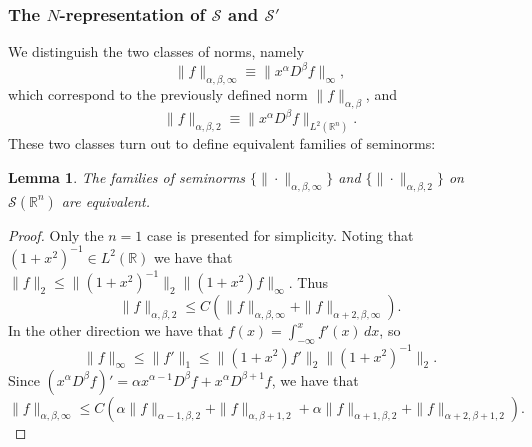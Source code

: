 \documentclass[prl,twocolumn,lengthcheck,superscriptaddress]{revtex4-1}
\newtheorem{lemma}{Lemma}
\theoremstyle{definition}
\theoremstyle{remark}
\begin{document}
\subsubsection{The $N$-representation of $\mathscr{S}$ and $\mathscr{S}'$}
We distinguish the two classes of norms, namely 
\begin{equation}
	\|f\|_{\alpha,\beta,\infty} \equiv \|x^\alpha D^\beta f\|_{\infty},
\end{equation}
which correspond to the previously defined norm $\|f\|_{\alpha,\beta}$, and 
\begin{equation}
	\|f\|_{\alpha,\beta,2} \equiv \|x^\alpha D^\beta f\|_{L^2(\mathbb{R}^n)}.
\end{equation}
These two classes turn out to define equivalent families of seminorms:
\begin{lemma}
	The families of seminorms $\{\|\cdot\|_{\alpha,\beta,\infty}\}$ and $\{\|\cdot\|_{\alpha,\beta,2}\}$ on $\mathscr{S}(\mathbb{R}^n)$ are equivalent.
\end{lemma}
\begin{proof}
	Only the $n=1$ case is presented for simplicity. Noting that $(1+x^2)^{-1} \in L^2(\mathbb{R})$ we have that $\|f\|_2 \le \|(1+x^2)^{-1}\|_2\|(1+x^2)f\|_{\infty}$. Thus
	\begin{equation}
		\|f\|_{\alpha,\beta,2} \le C(\|f\|_{\alpha,\beta,\infty} + \|f\|_{\alpha+2,\beta,\infty}).
	\end{equation}
	In the other direction we have that $f(x) = \int_{-\infty}^x f'(x)\, dx$, so
	\begin{equation}
		\|f\|_\infty \le \|f'\|_1 \le \|(1+x^2)f'\|_2\|(1+x^2)^{-1}\|_2.
	\end{equation}
	Since $(x^\alpha D^\beta f)' = \alpha x^{\alpha-1} D^\beta f + x^{\alpha} D^{\beta+1} f$, we have that
	\begin{equation}
		\|f\|_{\alpha,\beta,\infty} \le C(\alpha \|f\|_{\alpha-1,\beta,2} + \|f\|_{\alpha,\beta+1,2} + \alpha \|f\|_{\alpha+1,\beta,2} + \|f\|_{\alpha+2,\beta+1,2}).
	\end{equation}
\end{proof}
\end{document}
